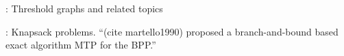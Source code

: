 \documentclass[oribibl]{llncs}
\begin{document}
\cite{mahadev1995}: Threshold graphs and related topics

\cite{martello1990b}: Knapsack problems. ``(cite martello1990) proposed a branch-and-bound based exact algorithm MTP for the BPP.'' 









%


\begin{comment}
- all citations have been changed to \cite{}, so that the citation shows up in green in latex. some of these citations need to be changed to (\citealp{}) (or \citep{}, same outcome) as the citations need to be in brackets but without the year in brackets.
- 1. "As proven by \cite{dosa2007}, ..." -> "As proven by Dosa (2007), ..."
- 2. "... FFD algorithm (\cite{eilon1971}), which ..." -> "... FFD algorithm (Eilon and Christofides (1971)), which .." NOTE THE YEAR IS IN BRACKETS INSIDE THE CITATION BRACKETS, THIS IS ONLY WHILE WRITING, THIS NEEDS TO BE CHANGED BEFORE SUBMISSION
- 3. "... FFD algorithm (\citealp{eilon1971}), which ..." -> "... FFD algorithm (Eilon and Christofides, 1971), which .." THIS IS HOW IT NEEDS TO BE WHEN SUBMITTING
\end{comment}
\end{document}
